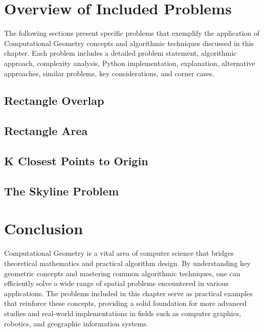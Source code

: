 \section{Overview of Included Problems}
The following sections present specific problems that exemplify the application of Computational Geometry concepts and algorithmic techniques discussed in this chapter. Each problem includes a detailed problem statement, algorithmic approach, complexity analysis, Python implementation, explanation, alternative approaches, similar problems, key considerations, and corner cases.

\subsection{Rectangle Overlap}


\subsection{Rectangle Area}


\subsection{K Closest Points to Origin}


\subsection{The Skyline Problem}


\section{Conclusion}
Computational Geometry is a vital area of computer science that bridges theoretical mathematics and practical algorithm design. By understanding key geometric concepts and mastering common algorithmic techniques, one can efficiently solve a wide range of spatial problems encountered in various applications. The problems included in this chapter serve as practical examples that reinforce these concepts, providing a solid foundation for more advanced studies and real-world implementations in fields such as computer graphics, robotics, and geographic information systems.

\printindex